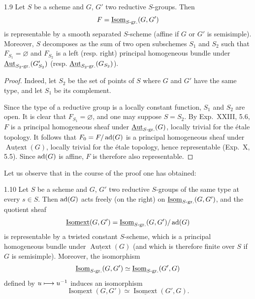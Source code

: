 \begin{corollary}{1.9}\label{XXIV.1.9}
Let $S$ be a scheme and $G$, $G'$ two reductive $S$-groups. Then
\[
F=\underline{\operatorname{Isom}}_{S\text{-gr.}}(G,G')
\]
is representable by a smooth separated $S$-scheme (affine if $G$ or $G'$ is semisimple). Moreover, $S$ decomposes as the sum of two open subschemes $S_1$ and $S_2$ such that $F_{S_1}=\varnothing$ and $F_{S_2}$ is a left (resp. right) principal homogeneous bundle under $\underline{\operatorname{Aut}}_{S_2\text{-gr.}}(G'_{S_2})$ (resp. $\underline{\operatorname{Aut}}_{S_2\text{-gr.}}(G_{S_2})$).
\end{corollary}
\begin{proof}
Indeed, let $S_2$ be the set of points of $S$ where $G$ and $G'$ have the same type, and let $S_1$ be its complement.

Since the type of a reductive group is a locally constant function, $S_1$ and $S_2$ are open. It is clear that $F_{S_1}=\varnothing$, and one may suppose $S=S_2$. By Exp.~XXIII, 5.6, $F$ is a principal homogeneous sheaf under $\underline{\operatorname{Aut}}_{S\text{-gr.}}(G)$, locally trivial for the étale topology. It follows that $F_0=F/\operatorname{ad}(G)$ is a principal homogeneous sheaf under $\underline{\operatorname{Autext}}(G)$, locally trivial for the étale topology, hence representable (Exp.~X, 5.5). Since $\operatorname{ad}(G)$ is affine, $F$ is therefore also representable.
\end{proof}
Let us observe that in the course of the proof one has obtained:
\begin{corollary}{1.10}\label{XXIV.1.10}
Let $S$ be a scheme and $G$, $G'$ two reductive $S$-groups of the same type at every $s\in S$. Then $\operatorname{ad}(G)$ acts freely (on the right) on $\underline{\operatorname{Isom}}_{S\text{-gr.}}(G,G')$, and the quotient sheaf
\[
\underline{\operatorname{Isomext}}(G,G')=\underline{\operatorname{Isom}}_{S\text{-gr.}}(G,G')/\operatorname{ad}(G)
\]
is representable by a twisted constant $S$-scheme, which is a principal homogeneous bundle under $\underline{\operatorname{Autext}}(G)$ (and which is therefore finite over $S$ if $G$ is semisimple). Moreover, the isomorphism
\[
\underline{\operatorname{Isom}}_{S\text{-gr.}}(G,G')\simeq\underline{\operatorname{Isom}}_{S\text{-gr.}}(G',G)
\]
defined by $u\longmapsto u^{-1}$ induces an isomorphism
\[
\underline{\operatorname{Isomext}}(G,G')\simeq\underline{\operatorname{Isomext}}(G',G).
\]
\end{corollary}
